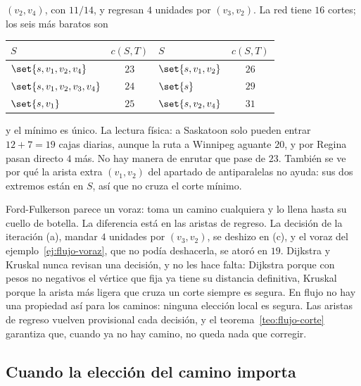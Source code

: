 \documentclass[11pt,letterpaper]{article}
\begin{document}
\begin{ejemplo}
  $(v_2, v_4)$, con $11/14$, y regresan $4$ unidades por
  $(v_3, v_2)$. La red tiene $16$ cortes; los seis más baratos son
  \begin{center}
  \small
  \begin{tabular}{lclc}
    \toprule
    $S$ & $c(S, T)$ & $S$ & $c(S, T)$ \\
    \midrule
    $\set{s, v_1, v_2, v_4}$ & $23$ & $\set{s, v_1, v_2}$ & $26$ \\
    $\set{s, v_1, v_2, v_3, v_4}$ & $24$ & $\set{s}$ & $29$ \\
    $\set{s, v_1}$ & $25$ & $\set{s, v_2, v_4}$ & $31$ \\
    \bottomrule
  \end{tabular}
  \end{center}
  y el mínimo es único. La lectura física: a Saskatoon solo pueden
  entrar $12 + 7 = 19$ cajas diarias, aunque la ruta a Winnipeg
  aguante $20$, y por Regina pasan directo $4$ más. No hay manera de
  enrutar que pase de $23$. También se ve por qué la arista extra
  $(v_1, v_2)$ del apartado de antiparalelas no ayuda: sus dos
  extremos están en $S$, así que no cruza el corte mínimo.
\end{ejemplo}

\begin{idea}
  Ford-Fulkerson parece un voraz: toma un camino cualquiera y lo
  llena hasta su cuello de botella. La diferencia está en las aristas
  de regreso. La decisión de la iteración (a), mandar $4$ unidades por
  $(v_3, v_2)$, se deshizo en (c), y el voraz del
  ejemplo~\ref{ej:flujo-voraz}, que no podía deshacerla, se atoró en
  $19$. Dijkstra y Kruskal nunca revisan una decisión, y no les hace
  falta: Dijkstra porque con pesos no negativos el vértice que fija ya
  tiene su distancia definitiva, Kruskal porque la arista más ligera
  que cruza un corte siempre es segura. En flujo no hay una propiedad
  así para los caminos: ninguna elección local es segura. Las aristas
  de regreso vuelven provisional cada decisión, y el
  teorema~\ref{teo:flujo-corte} garantiza que, cuando ya no hay
  camino, no queda nada que corregir.
\end{idea}


\subsection*{Cuando la elección del camino importa}
\end{document}
